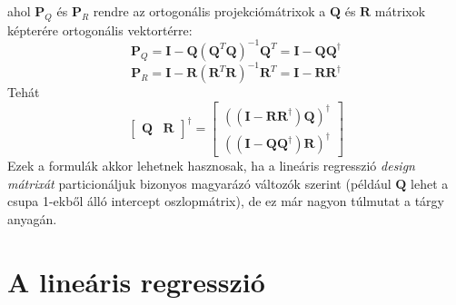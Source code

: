 \documentclass[14p]{report}
\def\pmb{\boldsymbol}
\newcounter{x}
\newcounter{y}
\newcounter{z}
\begin{document}
	ahol $\pmb{P}_{Q}$ és $\pmb{P}_{R}$ rendre az ortogonális projekciómátrixok a $\pmb{Q}$ és $\pmb{R}$ mátrixok képterére ortogonális vektortérre:
	\[
		\pmb{P}_{Q} = \pmb{I} - \pmb{Q}(\pmb{Q}^T\pmb{Q})^{-1}\pmb{Q}^T = \pmb{I} - \pmb{Q}\pmb{Q}^{\dagger}
	\]
	\[
		\pmb{P}_{R} = \pmb{I} - \pmb{R}(\pmb{R}^T\pmb{R})^{-1}\pmb{R}^T = \pmb{I} - \pmb{R}\pmb{R}^{\dagger}
	\]
	Tehát
	\[
		\begin{bmatrix}
			\pmb{Q} & \pmb{R}
		\end{bmatrix}^{\dagger} =
		\begin{bmatrix}
			((\pmb{I}-\pmb{R}\pmb{R}^{\dagger})\pmb{Q})^{\dagger} \\
			((\pmb{I}-\pmb{Q}\pmb{Q}^{\dagger})\pmb{R})^{\dagger}
		\end{bmatrix}
	\]
	Ezek a formulák akkor lehetnek hasznosak, ha a lineáris regresszió \emph{design mátrixát} particionáljuk bizonyos magyarázó változók szerint (például $\pmb{Q}$ lehet a csupa 1-ekből álló intercept oszlopmátrix), de ez már nagyon túlmutat a tárgy anyagán.  
	
	\chapter{A lineáris regresszió}
\end{document}
